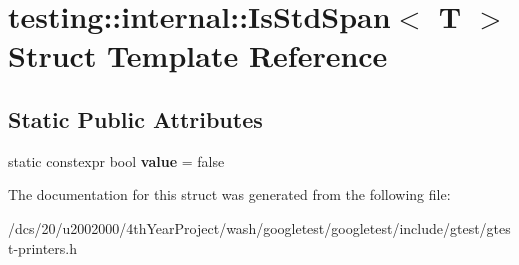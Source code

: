 \hypertarget{structtesting_1_1internal_1_1IsStdSpan}{}\section{testing\+:\+:internal\+:\+:Is\+Std\+Span$<$ T $>$ Struct Template Reference}
\label{structtesting_1_1internal_1_1IsStdSpan}
\subsection*{Static Public Attributes}
\begin{DoxyCompactItemize}
\item 
\mbox{\label{structtesting_1_1internal_1_1IsStdSpan_a5c0e17f8717ec254914dee5b8ce3c8ea}} 
static constexpr bool {\bfseries value} = false
\end{DoxyCompactItemize}


The documentation for this struct was generated from the following file\+:\begin{DoxyCompactItemize}
\item 
/dcs/20/u2002000/4th\+Year\+Project/wash/googletest/googletest/include/gtest/gtest-\/printers.\+h\end{DoxyCompactItemize}
